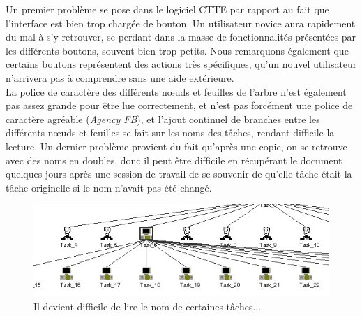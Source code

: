 \documentclass[12pt, a4paper]{article}
\begin{document}
Un premier problème se pose dans le logiciel CTTE par rapport au fait que l'interface est bien trop chargée de bouton. Un utilisateur novice aura rapidement du mal à s'y retrouver, se perdant dans la masse de fonctionnalités présentées par les différents boutons, souvent bien trop petits. Nous remarquons également que certains boutons représentent des actions très spécifiques, qu'un nouvel utilisateur n'arrivera pas à comprendre sans une aide extérieure.\\ 
La police de caractère des différents nœuds et feuilles de l'arbre n'est également pas assez grande pour être lue correctement, et n'est pas forcément une police de caractère agréable (\emph{Agency FB}), et l'ajout continuel de branches entre les différents nœuds et feuilles se fait sur les noms des tâches, rendant difficile la lecture. Un dernier problème provient du fait qu'après une copie, on se retrouve avec des noms en doubles, donc il peut être difficile en récupérant le document quelques jours après une session de travail de se souvenir de qu'elle tâche était la tâche originelle si le nom n'avait pas été changé. 
\begin{figure}[h]
\begin{center}
   \includegraphics[scale = 0.7]{empilement.jpg}
	\caption{Il devient difficile de lire le nom de certaines tâches...}
	\end{center}
\end{figure}
\end{document}
